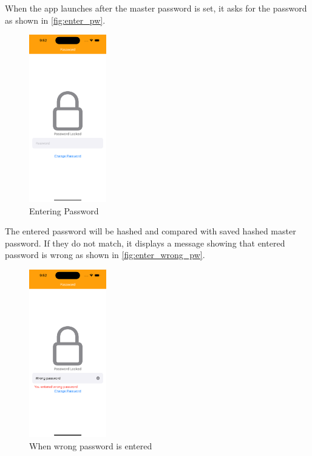 \documentclass[10pt, titlepage]{article}
\begin{document}
When the app launches after the master password is set, it asks for the password as shown in \autoref{fig:enter_pw}.
\begin{figure}[H]
	\centering
	\vspace{-0.25em}
	\includegraphics[width=0.3\textwidth]{img/enter_pw}
	\vspace{-0.75em}
	\caption{Entering Password}
	\label{fig:enter_pw}
	\vspace{-0.75em}
\end{figure}

The entered password will be hashed and compared with saved hashed master password. If they do not match, it displays a message showing that entered password is wrong as shown in \autoref{fig:enter_wrong_pw}. 
\begin{figure}[H]
	\centering
	\vspace{-0.25em}
	\includegraphics[width=0.3\textwidth]{img/enter_wrong_pw}
	\vspace{-0.75em}
	\caption{When wrong password is entered}
	\label{fig:enter_wrong_pw}
	\vspace{-0.75em}
\end{figure}
\end{document}
